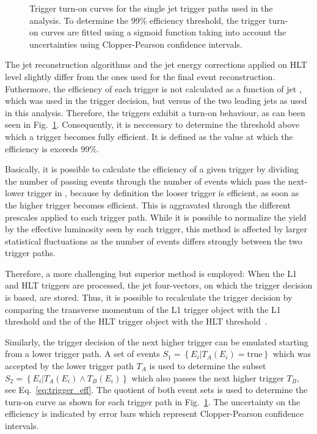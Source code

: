 \begin{figure}[htbp]
    \caption[Turn-on curves of single jet HLT trigger paths]{Trigger turn-on curves for the single jet trigger
    paths used in the analysis. To determine the 99\% efficiency threshold, the
    trigger turn-on curves are fitted using a sigmoid function taking into account the
    uncertainties using Clopper-Pearson confidence intervals.}
    \label{fig:trigger_eff}
\end{figure}

The jet reconstruction algorithms and the jet energy corrections applied on HLT
level slightly differ from the ones used for the final event reconstruction.
Futhermore, the efficiency of each trigger is not calculated as a function of
jet \pt, which was used in the trigger decision, but versus \ptavg of the two
leading jets as used in this analysis. Therefore, the triggers exhibit a turn-on
behaviour, as can been seen in Fig.~\ref{fig:trigger_eff}. Consequently, it is
neccessary to determine the threshold above which a trigger becomes fully
efficient. It is defined as the value at which the efficiency is exceeds 99\%.

Basically, it is possible to calculate the efficiency of a given trigger by
dividing the number of passing events through the number of events which pass
the next-lower trigger in \pt, because by definition the looser trigger is efficient,
as soon as the higher trigger becomes efficient. This is aggravated through the
different prescales applied to each trigger path. While it is possible to
normalize the yield by the effective luminosity seen by each trigger, this
method is affected by larger statistical fluctuations as the number of events
differs strongly between the two trigger paths.

Therefore, a more challenging but superior method is employed: When the L1
and HLT triggers are processed, the jet four-vectors, on
which the trigger decision is based, are stored. Thus, it is possible to
recalculate the trigger decision by comparing the transverse momentum of the L1
trigger object with the L1 threshold and the \pt of the HLT trigger object with
the HLT threshold~\cite{Stober:2012abc}.

Similarly, the trigger decision of the next higher trigger can be emulated
starting from a lower trigger path. A set of events $S_1 = \left\{E_i | T_A
(E_i) = \mathrm{true} \right\}$ which was accepted  by the lower trigger path $T_A$ is
used to determine the subset $S_2 = \left\{E_i|T_A(E_i) \wedge  T_B(E_i)
\right\}$ which also passes the next higher trigger $T_B$, see
Eq.~\ref{eq:trigger_eff}. The quotient of both event sets is used to determine
the turn-on curve as shown for each trigger path in Fig.~\ref{fig:trigger_eff}. 
The uncertainty on the efficiency is
indicated by error bars which represent Clopper-Pearson confidence intervals.

